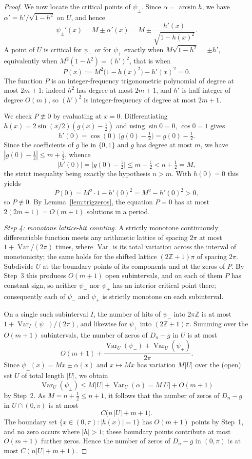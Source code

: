 \documentclass[11pt,reqno]{amsart}
\theoremstyle{plain}
\theoremstyle{definition}
\theoremstyle{remark}
\begin{document}
\begin{proof}
We now locate the critical points of $\psi_\pm$. Since $\alpha=\arcsin h$, we have $\alpha'=h'/\sqrt{1-h^2}$ on $U$, and hence
\[
  \psi_\pm'(x)=M\pm\alpha'(x)=M\pm\frac{h'(x)}{\sqrt{1-h(x)^2}}.
\]
A point of $U$ is critical for $\psi_-$ or for $\psi_+$ exactly when $M\sqrt{1-h^2}=\pm h'$, equivalently when $M^2(1-h^2)=(h')^2$, that is when
\[
  P(x):=M^2\bigl(1-h(x)^2\bigr)-h'(x)^2=0.
\]
The function $P$ is an integer-frequency trigonometric polynomial of degree at most $2m+1$: indeed $h^2$ has degree at most $2m+1$, and $h'$ is half-integer of degree $O(m)$, so $(h')^2$ is integer-frequency of degree at most $2m+1$.

We check $P\not\equiv0$ by evaluating at $x=0$. Differentiating $h(x)=2\sin(x/2)(g(x)-\tfrac12)$ and using $\sin0=0$, $\cos0=1$ gives
\[
  h'(0)=\cos(0)\,\bigl(g(0)-\tfrac12\bigr)=g(0)-\tfrac12.
\]
Since the coefficients of $g$ lie in $\{0,1\}$ and $g$ has degree at most $m$, we have $|g(0)-\tfrac12|\le m+\tfrac12$, whence
\[
  |h'(0)|=\bigl|g(0)-\tfrac12\bigr|\le m+\tfrac12<n+\tfrac12=M,
\]
the strict inequality being exactly the hypothesis $n>m$. With $h(0)=0$ this yields
\[
  P(0)=M^2\cdot 1-h'(0)^2=M^2-h'(0)^2>0,
\]
so $P\not\equiv0$. By Lemma~\ref{lem:trigzeros}, the equation $P=0$ has at most $2(2m+1)=O(m+1)$ solutions in a period.

\medskip
\emph{Step 4: monotone lattice-hit counting.}
A strictly monotone continuously differentiable function meets any arithmetic lattice of spacing $2\pi$ at most $1+\operatorname{Var}/(2\pi)$ times, where $\operatorname{Var}$ is its total variation across the interval of monotonicity; the same holds for the shifted lattice $(2\mathbb Z+1)\pi$ of spacing $2\pi$. Subdivide $U$ at the boundary points of its components and at the zeros of $P$. By Step~3 this produces $O(m+1)$ open subintervals, and on each of them $P$ has constant sign, so neither $\psi_-$ nor $\psi_+$ has an interior critical point there; consequently each of $\psi_-$ and $\psi_+$ is strictly monotone on each subinterval.

On a single such subinterval $I$, the number of hits of $\psi_-$ into $2\pi\mathbb Z$ is at most $1+\operatorname{Var}_I(\psi_-)/(2\pi)$, and likewise for $\psi_+$ into $(2\mathbb Z+1)\pi$. Summing over the $O(m+1)$ subintervals, the number of zeros of $D_n-g$ in $U$ is at most
\[
  O(m+1)+\frac{\operatorname{Var}_U(\psi_-)+\operatorname{Var}_U(\psi_+)}{2\pi}.
\]
Since $\psi_\pm(x)=Mx\pm\alpha(x)$ and $x\mapsto Mx$ has variation $M|U|$ over the (open) set $U$ of total length $|U|$, we obtain
\[
  \operatorname{Var}_U(\psi_\pm)\le M|U|+\operatorname{Var}_U(\alpha)=M|U|+O(m+1)
\]
by Step~2. As $M=n+\tfrac12\le n+1$, it follows that the number of zeros of $D_n-g$ in $U\cap(0,\pi)$ is at most
\[
  C\bigl(n\,|U|+m+1\bigr).
\]
The boundary set $\{x\in(0,\pi):|h(x)|=1\}$ has $O(m+1)$ points by Step~1, and no zero occurs where $|h|>1$; these boundary points contribute at most $O(m+1)$ further zeros. Hence the number of zeros of $D_n-g$ in $(0,\pi)$ is at most $C(n|U|+m+1)$.


\end{proof}
\end{document}
